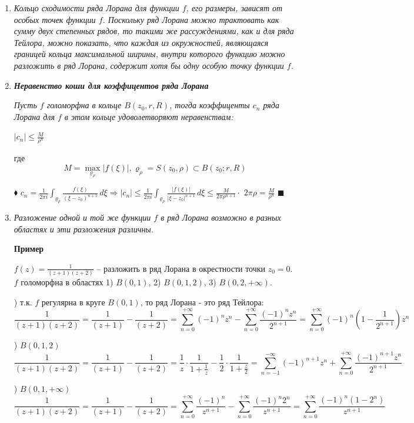 \documentclass[a4paper, 12pt]{report}
\begin{document}
\begin{enumerate}
\item \textsl{Кольцо сходимости ряда Лорана для функции $f$, его размеры, зависят от особых точек функции $f$. Поскольку ряд Лорана можно трактовать как сумму двух степенных рядов, то такими же рассуждениями, как и для ряда Тейлора, можно показать, что каждая из окружностей, являющаяся границей кольца максимальной ширины, внутри которого функцию можно разложить в ряд Лорана, содержит хотя бы одну особую точку функции $f$.}

\item \textsl{\textbf{Неравенство коши для коэффицентов ряда Лорана}}
\par
\textsl{Пусть $f$ голоморфна в кольце $B(z_0, r, R)$, тогда коэффиценты $c_n$ ряда Лорана для $f$ в этом кольце удоволетворяют неравенствам:}
\par\bigskip
\begin{center}
$|c_n| \le \frac{M}{\rho^n}$
\end{center}
\par\bigskip
где $$M = \max_{\varrho_\rho} |f(\xi)|, \varrho_\rho = S(z_0, \rho) \subset B(z_0; r, R)$$
\par\bigskip
$\blacklozenge$ $c_n = \frac{1}{2\pi i} \int_{\varrho_\rho} \frac{f(\xi)}{(\xi - z_0)^{n + 1}}\,d\xi \Rightarrow |c_n| \le \frac{1}{2\pi i} \int_{\varrho_\rho} \frac{|f(\xi)|}{|\xi - z_0|^{n + 1}}\,d\xi \le \frac{M}{2\pi \rho^{n + 1}}\cdot$ $ 2\pi \rho = \frac{M}{\rho^n} $ $\blacksquare$

\item \textsl{Разложение одной и той же функции $f$ в ряд Лорана возможно в разных областях и эти разложения различны.}


\par\bigskip
\textbf{Пример}
\par\bigskip
$f(z) = \frac{1}{(z+1)(z+2)}$ -- разложить в ряд Лорана в окрестности точки $z_0 = 0$. $f$ голоморфна в областях 1) $B(0, 1)$, 2) $B(0, 1, 2)$, 3) $B(0, 2, +\infty).$
\par{}) т.к. $f$ регулярна в круге $B(0, 1)$, то ряд Лорана - это ряд Тейлора:
$$\frac{1}{(z+1)(z+2)} = \frac{1}{(z+1)} - \frac{1}{(z+2)} = \sum_{n = 0}^{+\infty} (-1)^n z^n - \sum_{n = 0}^{+\infty} \frac{(-1)^n z^n}{2^{n + 1}} = \sum_{n = 0}^{+\infty} (-1)^n (1 - \frac{1}{2^{n + 1}}) z^n$$
\par{}) $B(0, 1, 2)$ 
$$\frac{1}{(z+1)(z+2)} = \frac{1}{(z+1)} - \frac{1}{(z+2)} = \frac{1}{z} \cdot \frac{1}{1 + \frac{1}{z}} - \frac{1}{2} \cdot \frac{1}{1 + \frac{z}{2}} = \sum_{n = -1}^{-\infty} (-1)^{n + 1} z^n + \sum_{n = 0}^{+\infty} \frac{(-1)^{n + 1} z^n}{2^{n + 1}}$$
\par{}) $B(0, 1, +\infty)$ 
$$\frac{1}{(z+1)(z+2)} = \frac{1}{(z+1)} - \frac{1}{(z+2)} = \sum_{n = 0}^{+\infty} \frac{(-1)^n}{z^{n + 1}} - \sum_{n = 0}^{+\infty} \frac{(-1)^{n} 2^n}{z^{n + 1}} = \sum_{n = 0}^{+\infty} \frac{(-1)^n(1 - 2^n)}{z^{n + 1}}$$

\end{enumerate}
\end{document}
